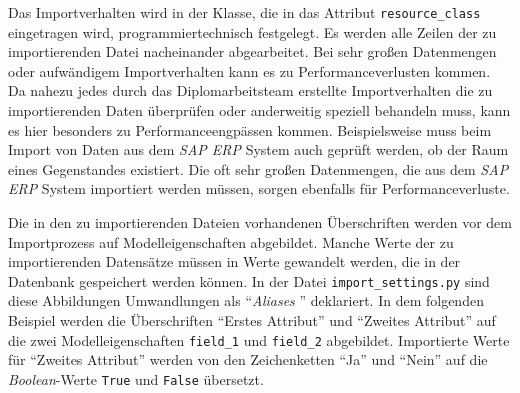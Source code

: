 Das Importverhalten wird in der Klasse, die in das Attribut
\texttt{resource\_class} eingetragen wird, programmiertechnisch
festgelegt. Es werden alle Zeilen der zu importierenden Datei
nacheinander abgearbeitet. Bei sehr großen Datenmengen oder aufwändigem
Importverhalten kann es zu Performanceverlusten kommen. Da nahezu jedes
durch das Diplomarbeitsteam erstellte Importverhalten die zu
importierenden Daten überprüfen oder anderweitig speziell behandeln
muss, kann es hier besonders zu Performanceengpässen kommen.
Beispielsweise muss beim Import von Daten aus dem \emph{SAP ERP}
System auch geprüft werden, ob der Raum eines Gegenstandes existiert.
Die oft sehr großen Datenmengen, die aus dem \emph{SAP ERP}
System importiert werden müssen, sorgen ebenfalls für
Performanceverluste.

Die in den zu importierenden Dateien vorhandenen Überschriften werden
vor dem Importprozess auf Modelleigenschaften abgebildet. Manche Werte
der zu importierenden Datensätze müssen in Werte gewandelt werden, die
in der Datenbank gespeichert werden können. In der Datei
\texttt{import\_settings.py} sind diese Abbildungen \bzw{} Umwandlungen
als ``\emph{Aliases} '' deklariert. In dem
folgenden Beispiel werden die Überschriften ``Erstes Attribut'' und
``Zweites Attribut'' auf die zwei Modelleigenschaften \texttt{field\_1}
und \texttt{field\_2} abgebildet. Importierte Werte für ``Zweites
Attribut'' werden von den Zeichenketten ``Ja'' und ``Nein'' auf die
\emph{Boolean}-Werte
\texttt{True} und \texttt{False} übersetzt.

\begin{Shaded}
\begin{Highlighting}[]
\OperatorTok{=}\NormalTok{ \{}
    \NormalTok{: ([}\NormalTok{], \{}

\NormalTok{    \}),}
    \NormalTok{: ([}\NormalTok{], \{}
      \NormalTok{: }\NormalTok{,}
      \NormalTok{: }
\NormalTok{    \}),}
\end{Highlighting}
\end{Shaded}

